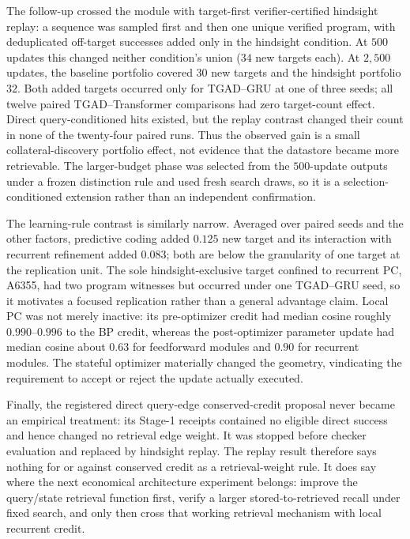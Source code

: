 \documentclass[11pt]{article}
\begin{document}
The follow-up crossed the module with target-first verifier-certified hindsight replay:
a sequence was sampled first and then one unique verified program, with deduplicated
off-target successes added only in the hindsight condition.  At $500$ updates this changed
neither condition's union ($34$ new targets each).  At $2{,}500$ updates, the baseline
portfolio covered $30$ new targets and the hindsight portfolio $32$.  Both added targets
occurred only for TGAD--GRU at one of three seeds; all twelve paired
TGAD--Transformer comparisons had zero target-count effect.  Direct query-conditioned
hits existed, but the replay contrast changed their count in none of the twenty-four
paired runs.  Thus the observed gain is a small collateral-discovery portfolio effect,
not evidence that the datastore became more retrievable.  The larger-budget phase was
selected from the $500$-update outputs under a frozen distinction rule and used fresh
search draws, so it is a selection-conditioned extension rather than an independent
confirmation.

The learning-rule contrast is similarly narrow.  Averaged over paired seeds and the other
factors, predictive coding added $0.125$ new target and its interaction with recurrent
refinement added $0.083$; both are below the granularity of one target at the replication
unit.  The sole hindsight-exclusive target confined to recurrent PC, A6355, had two
program witnesses but occurred under one TGAD--GRU seed, so it motivates a focused
replication rather than a general advantage claim.  Local PC was not merely inactive:
its pre-optimizer credit had median cosine roughly $0.990$--$0.996$ to the BP credit,
whereas the post-optimizer parameter update had median cosine about $0.63$ for feedforward
modules and $0.90$ for recurrent modules.  The stateful optimizer materially changed the
geometry, vindicating the requirement to accept or reject the update actually executed.

Finally, the registered direct query-edge conserved-credit proposal never became an
empirical treatment: its Stage-1 receipts contained no eligible direct success and hence
changed no retrieval edge weight.  It was stopped before checker evaluation and replaced
by hindsight replay.  The replay result therefore says nothing for or against conserved
credit as a retrieval-weight rule.  It does say where the next economical architecture
experiment belongs: improve the query/state retrieval function first, verify a larger
stored-to-retrieved recall under fixed search, and only then cross that working retrieval
mechanism with local recurrent credit.
\end{document}
